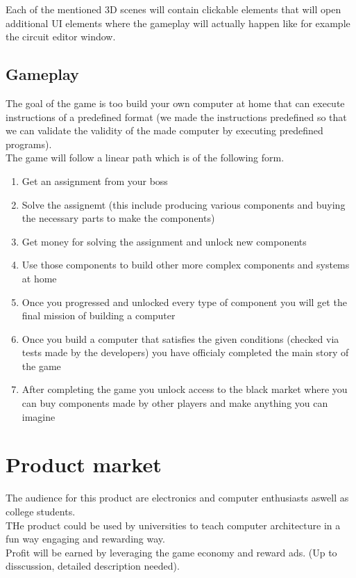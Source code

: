 \documentclass[12pt]{article}
\begin{document}
Each of the mentioned 3D scenes will contain clickable elements that will open additional UI elements where the gameplay will actually happen 
like for example the circuit editor window.

\subsection{Gameplay}
The goal of the game is too build your own computer at home that can execute instructions of a predefined format (we made the instructions 
predefined so that we can validate the validity of the made computer by executing predefined programs).\\
The game will follow a linear path which is of the following form.\\
\begin{enumerate}
    \item Get an assignment from your boss 
    \item Solve the assignemt (this include producing various components and buying the necessary parts to make the components) 
    \item Get money for solving the assignment and unlock new components 
    \item Use those components to build other more complex components and systems at home 
    \item Once you progressed and unlocked every type of component you will get the final mission of building a computer  
    \item Once you build a computer that satisfies the given conditions (checked via tests made by the developers) you have officialy completed the main story of the game 
    \item After completing the game you unlock access to the black market where you can buy components made by other players and make anything you can imagine
\end{enumerate}







\section{Product market}
The audience for this product are electronics and computer enthusiasts aswell as college students.\\
THe product could be used by universities to teach computer architecture in a fun way engaging and rewarding way.\\
Profit will be earned by leveraging the game economy and reward ads. (Up to disscussion, detailed description needed).\\
\end{document}
